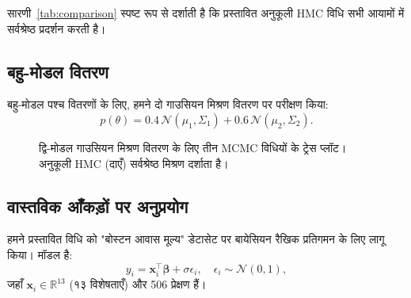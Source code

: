 \documentclass[12pt,a4paper]{article}
\theoremstyle{plain}
\theoremstyle{definition}
\theoremstyle{remark}
\begin{document}
सारणी~\ref{tab:comparison} स्पष्ट रूप से दर्शाती है कि प्रस्तावित
अनुकूली HMC विधि सभी आयामों में सर्वश्रेष्ठ प्रदर्शन करती है।

\subsection{बहु-मोडल वितरण}

बहु-मोडल पश्च वितरणों के लिए, हमने दो गाउसियन मिश्रण
वितरण पर परीक्षण किया:
\[
p(\theta) = 0.4 \, \mathcal{N}(\mu_1, \Sigma_1) + 0.6 \, \mathcal{N}(\mu_2, \Sigma_2).
\]

\begin{figure}[ht]
\centering
{}
\caption{द्वि-मोडल गाउसियन मिश्रण वितरण के लिए तीन MCMC विधियों
के ट्रेस प्लॉट। अनुकूली HMC (दाएँ) सर्वश्रेष्ठ मिश्रण दर्शाता है।}
\label{fig:trace}
\end{figure}

\subsection{वास्तविक आँकड़ों पर अनुप्रयोग}

हमने प्रस्तावित विधि को "बोस्टन आवास मूल्य" डेटासेट पर
बायेसियन रैखिक प्रतिगमन के लिए लागू किया। मॉडल है:
\begin{equation}
\label{eq:regression}
y_i = \mathbf{x}_i^\top \bm{\beta} + \sigma \epsilon_i, \quad \epsilon_i \sim \mathcal{N}(0, 1),
\end{equation}
जहाँ $\mathbf{x}_i \in \mathbb{R}^{13}$ (१३ विशेषताएँ) और 506 प्रेक्षण हैं।
\end{document}
